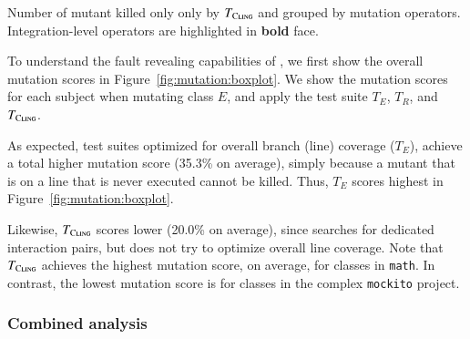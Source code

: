\begin{table} [t]
	\center
	\caption{Number of mutant killed only only by $T_{\textsc{Cling}}$ and grouped by mutation operators. Integration-level operators are highlighted in \textbf{bold} face.}
	\label{tab:mutant-operators-table}
	
\end{table} 

To understand the fault revealing capabilities of \integration, we first show the overall mutation scores in Figure~\ref{fig:mutation:boxplot}.
We show the mutation scores for each subject when mutating class $E$, and apply the test suite $T_E$, $T_R$, and $T_{\textsc{Cling}}$.

As expected, test suites optimized for overall branch (line) coverage ($T_E$), achieve a total higher mutation score (35.3\% on average), simply because a mutant that is on a line that is never executed cannot be killed. 
Thus, $T_E$ scores highest in Figure~\ref{fig:mutation:boxplot}.

Likewise, $T_{\textsc{Cling}}$ scores lower (20.0\% on average), since \integration searches for dedicated interaction pairs, but does not try to optimize overall line coverage.
Note that $T_{\textsc{Cling}}$ achieves the highest mutation score, on average, for classes in \texttt{math}. In contrast, the lowest mutation score is for classes in the complex \texttt{mockito} project.
%

\subsubsection{Combined analysis}

